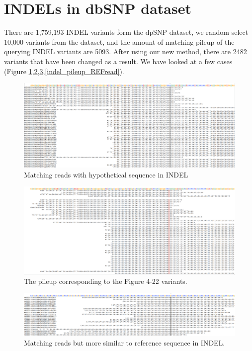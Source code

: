 \section{INDELs in dbSNP dataset}

There are 1,759,193 INDEL variants form the dpSNP dataset, we random select 10,000 variants from the dataset, and the amount of matching pileup of the querying INDEL variants are 5093. After using our new method, there are 2482 variants that have been changed as a result.  We have looked at a few cases  (Figure \ref{indel_new_ALTread},\ref{indel_pileup_ALTread},\ref{indel_new_REFread},\ref{indel_pileup_REFread}).

\begin{figure}[H]
\centering
\includegraphics[width=1\columnwidth]{body/image/indel_new_ALTread.png}
\caption[INDEL match reads]{Matching reads with hypothetical sequence in INDEL}
\label{indel_new_ALTread}
\end{figure}

\begin{figure}[H]
\centering
\includegraphics[width=1\columnwidth]{body/image/indel_pileup_ALTread.png}
\caption[Figure 4.22 pileup]{The pileup corresponding to the Figure 4-22 variants.}
\label{indel_pileup_ALTread}
\end{figure}

\begin{figure}[H]
\centering
\includegraphics[width=1\columnwidth]{body/image/indel_new_REFread.png}
\caption[INDEL worse match reads]{Matching reads but more similar to reference sequence in INDEL.}
\label{indel_new_REFread}
\end{figure}


